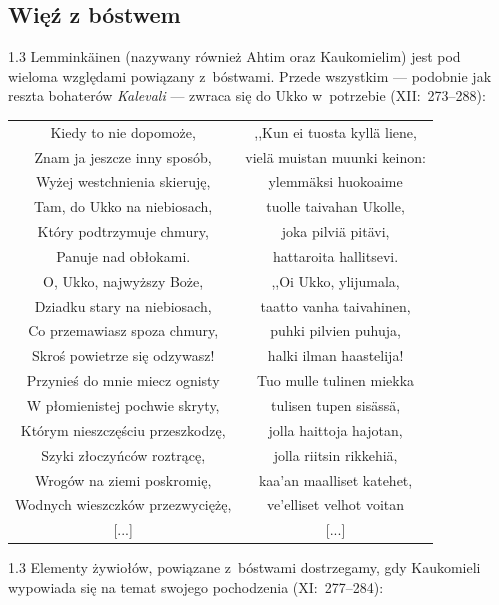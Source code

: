 \documentclass[11pt,a4paper,twoside]{report}
\begin{document}
\subsection*{Więź z bóstwem}
\begin{spacing}{1.3}
Lemminkäinen (nazywany również Ahtim oraz Kaukomielim) jest pod wieloma względami powiązany z~bóstwami. Przede wszystkim --- podobnie jak reszta bohaterów \emph{Kalevali} --- zwraca się do Ukko w~potrzebie (XII:~273--288):
\end{spacing}
{\centering
\small
\begin{longtable}{c c}
Kiedy to nie dopomoże, & ,,Kun ei tuosta kyllä liene, \\
Znam ja jeszcze inny sposób, & vielä muistan muunki keinon: \\
Wyżej westchnienia skieruję, & ylemmäksi huokoaime \\
Tam, do Ukko na niebiosach, & tuolle taivahan Ukolle, \\
Który podtrzymuje chmury, & joka pilviä pitävi, \\
Panuje nad obłokami. & hattaroita hallitsevi. \\
O, Ukko, najwyższy Boże, & ,,Oi Ukko, ylijumala, \\
Dziadku stary na niebiosach, & taatto vanha taivahinen, \\
Co przemawiasz spoza chmury, & puhki pilvien puhuja, \\
Skroś powietrze się odzywasz! & halki ilman haastelija! \\
Przynieś do mnie miecz ognisty & Tuo mulle tulinen miekka \\
W płomienistej pochwie skryty, & tulisen tupen sisässä, \\
Którym nieszczęściu przeszkodzę, & jolla haittoja hajotan, \\
Szyki złoczyńców roztrącę, & jolla riitsin rikkehiä, \\
Wrogów na ziemi poskromię, & kaa'an maalliset katehet, \\
Wodnych wieszczków przezwyciężę, & ve'elliset velhot voitan \\
{[...]} & {[...]} \\
\end{longtable}
}
\begin{spacing}{1.3}
Elementy żywiołów, powiązane z~bóstwami dostrzegamy, gdy Kaukomieli wypowiada się na temat swojego pochodzenia (XI:~277--284):
\end{spacing}
\end{document}

